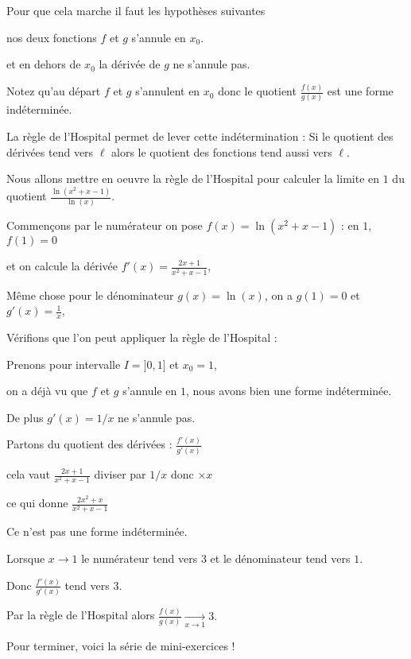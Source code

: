 Pour que cela marche il faut les hypothèses suivantes


nos deux fonctions $f$ et $g$ s'annule en $x_0$.

et en dehors de $x_0$ la dérivée de $g$ ne s'annule pas.


Notez qu'au départ $f$ et $g$ s'annulent en $x_0$ donc le quotient
$\frac{f(x)}{g(x)}$ est une forme indéterminée.

La règle de l'Hospital permet de lever cette indétermination :
Si le quotient des dérivées tend vers $\ell$ alors le quotient des fonctions tend aussi  
vers $\ell$.




\diapo

Nous allons mettre en oeuvre la règle de l'Hospital pour calculer 
la limite en $1$ du quotient $\frac{\ln(x^2+x-1)}{\ln(x)}$.

\change

Commençons par le numérateur 
on pose  $f(x)=\ln(x^2+x-1)$ : en $1$, $f(1)=0$

et on calcule la dérivée  $f'(x)=\frac{2x+1}{x^2+x-1}$,

\change

Même chose pour le dénominateur $g(x)=\ln(x)$, on a $g(1)=0$ et $g'(x)=\frac 1x$, 

\change

Vérifions que l'on peut appliquer la règle de l'Hospital :

Prenons pour intervalle $I=]0,1]$ et $x_0=1$, 

on a déjà vu que $f$ et $g$ s'annule en $1$, nous avons bien une forme indéterminée.

De plus $g'(x)=1/x$ ne s'annule pas.

\change

Partons du quotient des dérivées : $\frac{f'(x)}{g'(x)}$

\change

cela vaut $\frac{2x+1}{x^2+x-1}$ diviser par $1/x$ donc $ \times x$

\change

ce qui donne $\frac{2x^2+x}{x^2+x-1}$

Ce n'est pas une forme indéterminée.

\change

Lorsque $x\to 1$ le numérateur tend vers $3$ et le dénominateur tend vers $1$.

Donc $\frac{f'(x)}{g'(x)}$ tend vers $3$.

\change

Par la règle de l'Hospital alors $\frac{f(x)}{g(x)} \xrightarrow[x\to 1]{} 3.$

\diapo

Pour terminer, voici la série de mini-exercices !

